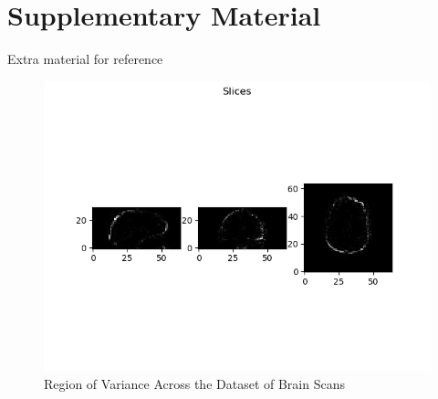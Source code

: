 \documentclass[10pt,twocolumn,letterpaper]{article}
\begin{document}
\section{Supplementary Material}\label{sec:supplementary}

Extra material for reference

 \begin{figure}
  \includegraphics[width=\linewidth]{images/var_on_cortex_2.png}
  \caption{Region of Variance Across the Dataset of Brain Scans}
  \label{fig:cortex-var}
\end{figure}
\end{document}
